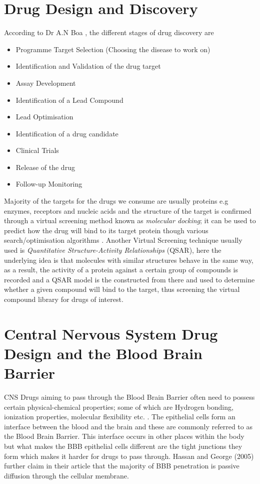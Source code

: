 \documentclass[a4paper,12pt]{report}
\begin{document}
	\section{Drug Design and Discovery}
	According to Dr A.N Boa \cite{hull2016}, the different stages of drug discovery are
		\begin{itemize}
			\item Programme Target Selection (Choosing the disease to work on)
			\item Identification and Validation of the drug target
			\item Assay Development
			\item Identification of a Lead Compound
			\item Lead Optimisation
			\item Identification of a drug candidate 
			\item Clinical Trials 
			\item Release of the drug 
			\item Follow-up Monitoring
		\end{itemize}
	Majority of the targets for the drugs we consume are usually proteins e.g enzymes, receptors and nucleic acids and the structure of the target is confirmed through a virtual screening method known as \textit{molecular docking}; it can be used to predict how the drug will bind to its target protein though various search/optimisation algorithms \cite{Jurgen2004}.
	Another Virtual Screening technique usually used is \textit{Quantitative Structure-Activity Relationships} (QSAR), here the underlying idea is that molecules with similar structures behave in the same way, as a result, the activity of a protein against a certain group of compounds is recorded and a QSAR model is the constructed from there and used to determine whether a given compound will bind to the target, thus screening the virtual compound library for drugs of interest.
	
	\section[CNS Drug Design and the Blood Brain Barrier]{Central Nervous System Drug Design and the Blood Brain Barrier}
	CNS Drugs aiming to pass through the Blood Brain Barrier often need to possess certain physical-chemical properties; some of which are Hydrogen bonding, ionization properties, molecular flexibility etc. \cite{Hassanetal2005}. The epithelial cells form an interface between the blood and the brain and these are commonly referred to as the Blood Brain Barrier. This interface occurs in other places within the body but what makes the BBB epithelial cells different are the tight junctions they form which makes it harder for drugs to pass through. Hassan and George (2005) further claim in their article that the majority of BBB penetration is passive diffusion through the cellular membrane.
\end{document}
